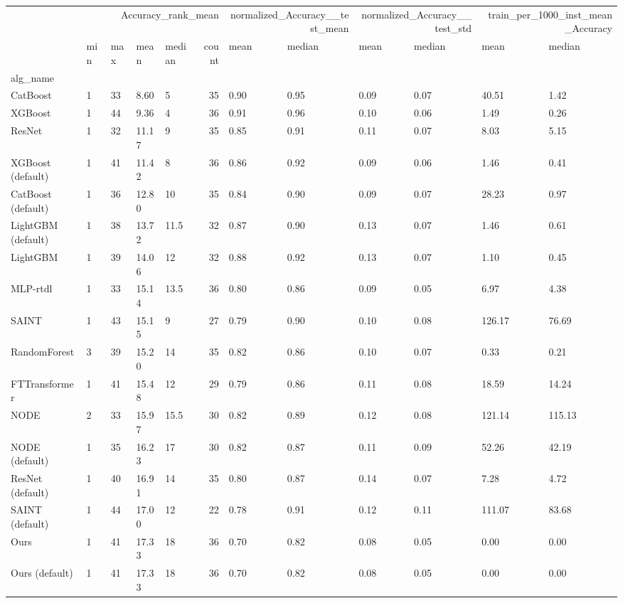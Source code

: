 \begin{tabular}{lllllrllllll}
\toprule
 & \multicolumn{5}{r}{Accuracy_rank_mean} & \multicolumn{2}{r}{normalized_Accuracy__test_mean} & \multicolumn{2}{r}{normalized_Accuracy__test_std} & \multicolumn{2}{r}{train_per_1000_inst_mean_Accuracy} \\
 & min & max & mean & median & count & mean & median & mean & median & mean & median \\
alg_name &  &  &  &  &  &  &  &  &  &  &  \\
\midrule
CatBoost & 1 & 33 & 8.60 & 5 & 35 & 0.90 & 0.95 & 0.09 & 0.07 & 40.51 & 1.42 \\
XGBoost & 1 & 44 & 9.36 & 4 & 36 & 0.91 & 0.96 & 0.10 & 0.06 & 1.49 & 0.26 \\
ResNet & 1 & 32 & 11.17 & 9 & 35 & 0.85 & 0.91 & 0.11 & 0.07 & 8.03 & 5.15 \\
XGBoost (default) & 1 & 41 & 11.42 & 8 & 36 & 0.86 & 0.92 & 0.09 & 0.06 & 1.46 & 0.41 \\
CatBoost (default) & 1 & 36 & 12.80 & 10 & 35 & 0.84 & 0.90 & 0.09 & 0.07 & 28.23 & 0.97 \\
LightGBM (default) & 1 & 38 & 13.72 & 11.5 & 32 & 0.87 & 0.90 & 0.13 & 0.07 & 1.46 & 0.61 \\
LightGBM & 1 & 39 & 14.06 & 12 & 32 & 0.88 & 0.92 & 0.13 & 0.07 & 1.10 & 0.45 \\
MLP-rtdl & 1 & 33 & 15.14 & 13.5 & 36 & 0.80 & 0.86 & 0.09 & 0.05 & 6.97 & 4.38 \\
SAINT & 1 & 43 & 15.15 & 9 & 27 & 0.79 & 0.90 & 0.10 & 0.08 & 126.17 & 76.69 \\
RandomForest & 3 & 39 & 15.20 & 14 & 35 & 0.82 & 0.86 & 0.10 & 0.07 & 0.33 & 0.21 \\
FTTransformer & 1 & 41 & 15.48 & 12 & 29 & 0.79 & 0.86 & 0.11 & 0.08 & 18.59 & 14.24 \\
NODE & 2 & 33 & 15.97 & 15.5 & 30 & 0.82 & 0.89 & 0.12 & 0.08 & 121.14 & 115.13 \\
NODE (default) & 1 & 35 & 16.23 & 17 & 30 & 0.82 & 0.87 & 0.11 & 0.09 & 52.26 & 42.19 \\
ResNet (default) & 1 & 40 & 16.91 & 14 & 35 & 0.80 & 0.87 & 0.14 & 0.07 & 7.28 & 4.72 \\
SAINT (default) & 1 & 44 & 17.00 & 12 & 22 & 0.78 & 0.91 & 0.12 & 0.11 & 111.07 & 83.68 \\
Ours & 1 & 41 & 17.33 & 18 & 36 & 0.70 & 0.82 & 0.08 & 0.05 & 0.00 & 0.00 \\
Ours (default) & 1 & 41 & 17.33 & 18 & 36 & 0.70 & 0.82 & 0.08 & 0.05 & 0.00 & 0.00 \\

\end{tabular}
